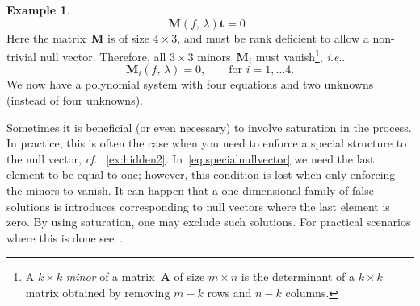 \documentclass[11pt,a4paper]{article}
\makeatletter
\theoremstyle{definition}
\newtheorem{example}{Example}
\newcommand{\te}[1]{\text{#1}}
\newcommand{\mat}[1]{\bm{#1}}
\DeclareRobustCommand\ie{\emph{i.e}\@ifnextchar.{}{.\@}}
\DeclareRobustCommand\cf{\emph{cf}\@ifnextchar.{}{.\@}}
\makeatother
\begin{document}
\begin{example}
\begin{equation}
\mat{M}(f,\,\lambda)\mat{t} = 0\;.
\end{equation}
Here the matrix~$\mat{M}$ is of size $4\times 3$, and must be rank deficient to allow a non-trivial
null vector. Therefore, all $3\times 3$ minors~$\mat{M}_i$ must vanish\footnote{A
$k\times k$ \emph{minor} of a matrix~$\mat{A}$ of size $m\times n$ is the determinant of a $k\times k$ matrix obtained by removing $m-k$ rows and $n-k$ columns.}, \ie{}
\begin{equation}
    \mat{M}_i(f,\,\lambda) = 0,  \qquad \te{for }i=1,\ldots 4.
\end{equation}
We now have a polynomial system with four equations and two unknowns (instead of four unknowns).
\end{example}

Sometimes it is beneficial (or even necessary) to involve saturation in the process.
In practice, this is often the case when you need to enforce a special structure to the
null vector, \cf{}~\cref{ex:hidden2}. In~\cref{eq:specialnullvector} we need the last
element to be equal to one; however, this condition is lost when only enforcing the minors
to vanish. It can happen that a one-dimensional family of false solutions is introduces corresponding
to null vectors where the last element is zero.
By using saturation, one may exclude such solutions. For practical scenarios where this is done
see~\cite{pritts2017,valtonenoernhag-etal-wacv-2021}.
\end{document}
